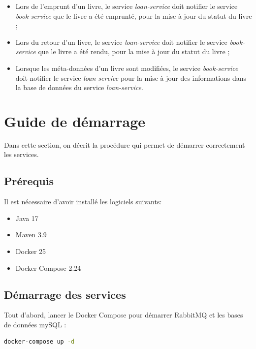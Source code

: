 \documentclass[
  french,
  a4paper,
]{scrartcl}
\begin{document}
\begin{itemize}
  \item Lors de l'emprunt d'un livre, le service \textit{loan-service} doit notifier le service
    \textit{book-service} que le livre a été emprunté, pour la mise à jour du statut du livre ; 
    
  \item Lors du retour d'un livre, le service \textit{loan-service} doit notifier le service
    \textit{book-service} que le livre a été rendu, pour la mise à jour du statut du livre ; 

  \item Lorsque les méta-données d'un livre sont modifiées, le service \textit{book-service} doit
    notifier le service \textit{loan-service} pour la mise à jour des informations dans la base de données
    du service \textit{loan-service}.
\end{itemize}



\section{Guide de démarrage}

Dans cette section, on décrit la procédure qui permet de démarrer correctement les services. 

\subsection{Prérequis}

Il est nécessaire d'avoir installé les logiciels suivants:

\begin{itemize}
  \item Java 17
  \item Maven 3.9
  \item Docker 25
  \item Docker Compose 2.24
\end{itemize}

\subsection{Démarrage des services}

Tout d'abord, lancer le Docker Compose pour démarrer RabbitMQ et les bases de données mySQL : 

\begin{lstlisting}[language=bash]
docker-compose up -d
\end{lstlisting}
\end{document}

